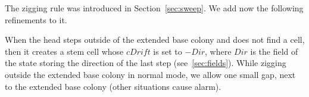\documentclass[12pt]{memoir}
\newcommand{\fld}[1]{\ensuremath{\textit{#1}}}
\newcommand{\Z}{Z}
\newcommand{\Dir}{\fld{Dir}}
\newcommand{\cDrift}{\fld{cDrift}}
\begin{document}
The zigging rule was introduced in Section~\ref{sec:sweep}.
We add now the following refinements to it.

When the head steps outside of the extended base colony and
does not find a cell, then it creates a stem cell whose
$\cDrift$ is set to $-\Dir$, where $\Dir$ is the field
of the state storing the direction of the last step (see~\ref{sec:fields}).
While zigging outside the extended base colony in normal mode,
we allow one small gap, next to the extended base colony
(other situations cause alarm).






\end{document}
